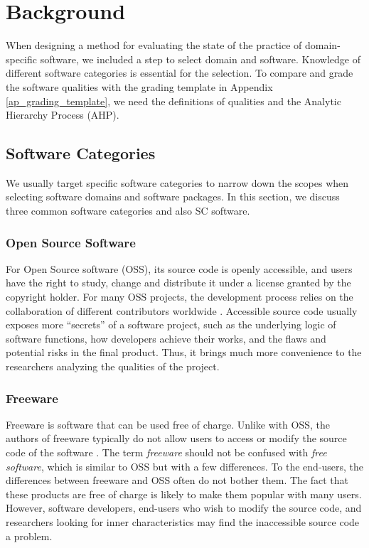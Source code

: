 \chapter{Background}
\label{ch_background}

When designing a method for evaluating the state of the practice of domain-specific software, we included a step to select domain and software. Knowledge of different software categories is essential for the selection. To compare and grade the software qualities with the grading template in Appendix \ref{ap_grading_template}, we need the definitions of qualities and the Analytic Hierarchy Process (AHP).

\section{Software Categories}
We usually target specific software categories to narrow down the scopes when selecting software domains and software packages. In this section, we discuss three common software categories and also SC software.

\subsection{Open Source Software}
\label{sec_open_source_software}
For Open Source software (OSS), its source code is openly accessible, and users have the right to study, change and distribute it under a license granted by the copyright holder. For many OSS projects, the development process relies on the collaboration of different contributors worldwide \cite{Corbly2014}. Accessible source code usually exposes more ``secrets'' of a software project, such as the underlying logic of software functions, how developers achieve their works, and the flaws and potential risks in the final product. Thus, it brings much more convenience to the researchers analyzing the qualities of the project.

\subsection{Freeware}
\label{sec_freeware}
Freeware is software that can be used free of charge. Unlike with OSS, the authors of freeware typically do not allow users to access or modify the source code of the software \cite{LINFO2006}. The term \textit{freeware} should not be confused with \textit{free software}, which is similar to OSS but with a few differences. To the end-users, the differences between freeware and OSS often do not bother them. The fact that these products are free of charge is likely to make them popular with many users. However, software developers, end-users who wish to modify the source code, and researchers looking for inner characteristics may find the inaccessible source code a problem. 

